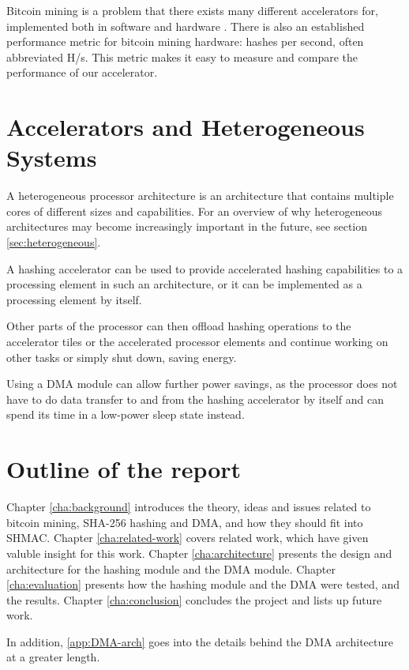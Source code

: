Bitcoin mining is a problem that there exists many different accelerators
for, implemented both in software and hardware \cite{bespoke-silicon}.
There is also an established performance metric for bitcoin mining hardware:
hashes per second, often abbreviated H/s. This metric makes it easy
to measure and compare the performance of our accelerator.

\section{Accelerators and Heterogeneous Systems}

A heterogeneous processor architecture is an architecture that contains multiple
cores of different sizes and capabilities. For an overview of why heterogeneous
architectures may become increasingly important in the future, see section
\ref{sec:heterogeneous}.

A hashing accelerator can be used to provide accelerated hashing capabilities
to a processing element in such an architecture, or it can be implemented as
a processing element by itself.

Other parts of the processor can then offload hashing operations to the
accelerator tiles or the accelerated processor elements and continue
working on other tasks or simply shut down, saving energy.

Using a DMA module can allow further
power savings, as the processor does not have to do data transfer to
and from the hashing accelerator by itself and can spend its time
in a low-power sleep state instead.

\section{Outline of the report}
Chapter \ref{cha:background} introduces the theory, ideas and issues related to bitcoin mining, SHA-256 hashing and DMA, and how they should fit into SHMAC.
Chapter \ref{cha:related-work} covers related work, which have given valuble insight for this work.
Chapter \ref{cha:architecture} presents the design and architecture for the hashing module and the DMA module.
Chapter \ref{cha:evaluation} presents how the hashing module and the DMA were tested, and the results.
Chapter \ref{cha:conclusion} concludes the project and lists up future work.

In addition, \ref{app:DMA-arch} goes into the details behind the DMA architecture at a greater length.